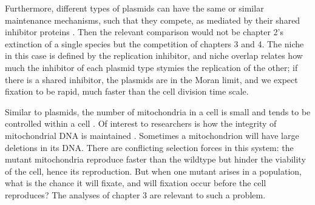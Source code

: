 Furthermore, different types of plasmids can have the same or similar maintenance mechanisms, such that they compete, as mediated by their shared inhibitor proteins \cite{DelSolar1998}. 
Then the relevant comparison would not be chapter 2's extinction of a single species but the competition of chapters 3 and 4. 
The niche in this case is defined by the replication inhibitor, and niche overlap relates how much the inhibitor of each plasmid type stymies the replication of the other; if there is a shared inhibitor, the plasmids are in the Moran limit, and we expect fixation to be rapid, much faster than the cell division time scale. 

Similar to plasmids, the number of mitochondria in a cell is small and tends to be controlled within a cell \cite{Michaels1982,Shuster1988,Taanman1999}. 
Of interest to researchers is how the integrity of mitochondrial DNA is maintained \cite{Taanman1999}. 
Sometimes a mitochondrion will have large deletions in its DNA. 
There are conflicting selection forces in this system: the mutant mitochondria reproduce faster than the wildtype but hinder the viability of the cell, hence its reproduction. 
But when one mutant arises in a population, what is the chance it will fixate, and will fixation occur before the cell reproduces? 
The analyses of chapter 3 are relevant to such a problem. 

